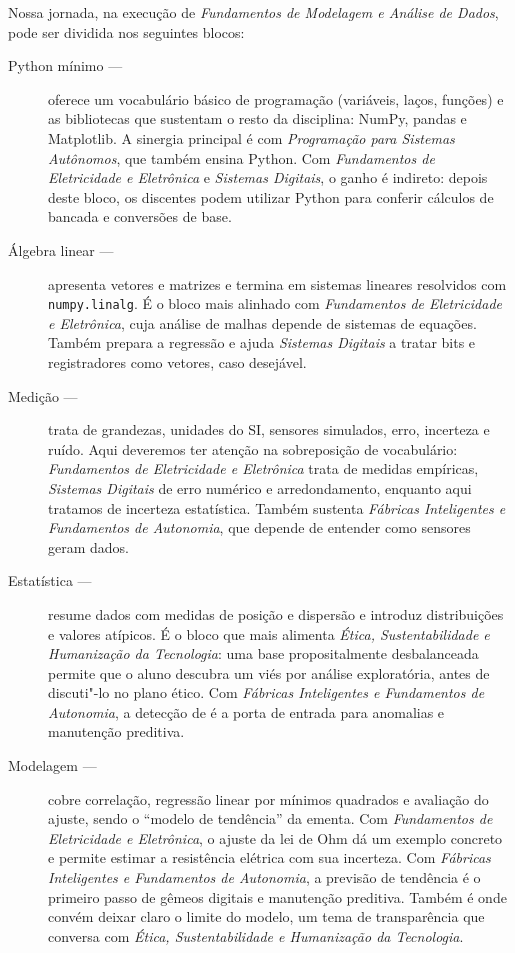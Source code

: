 Nossa jornada, na execução de \emph{Fundamentos de Modelagem e Análise de Dados}, pode ser dividida nos seguintes blocos:
\begin{description}
	\item[Python mínimo ---] oferece um vocabulário básico de programação (variáveis, laços, funções) e as bibliotecas que sustentam o resto da disciplina: NumPy, pandas e Matplotlib. A sinergia principal é com \emph{Programação para Sistemas Autônomos}, que também ensina Python. Com \emph{Fundamentos de Eletricidade e Eletrônica} e \emph{Sistemas Digitais}, o ganho é indireto: depois deste bloco, os discentes podem utilizar Python para conferir cálculos de bancada e conversões de base.
	\item[Álgebra linear ---] apresenta vetores e matrizes e termina em sistemas lineares resolvidos com \lstinline{numpy.linalg}. É o bloco mais alinhado com \emph{Fundamentos de Eletricidade e Eletrônica}, cuja análise de malhas depende de sistemas de equações. Também prepara a regressão e ajuda \emph{Sistemas Digitais} a tratar bits e registradores como vetores, caso desejável.
	\item[Medição ---] trata de grandezas, unidades do SI, sensores simulados, erro, incerteza e ruído. Aqui deveremos ter atenção na sobreposição de vocabulário: \emph{Fundamentos de Eletricidade e Eletrônica} trata de medidas empíricas, \emph{Sistemas Digitais} de erro numérico e arredondamento, enquanto aqui tratamos de incerteza estatística. Também sustenta \emph{Fábricas Inteligentes e Fundamentos de Autonomia}, que depende de entender como sensores geram dados.
	\item[Estatística ---] resume dados com medidas de posição e dispersão e introduz distribuições e valores atípicos. É o bloco que mais alimenta \emph{Ética, Sustentabilidade e Humanização da Tecnologia}: uma base propositalmente desbalanceada permite que o aluno descubra um viés por análise exploratória, antes de discuti"-lo no plano ético. Com \emph{Fábricas Inteligentes e Fundamentos de Autonomia}, a detecção de  é a porta de entrada para anomalias e manutenção preditiva.
	\item[Modelagem ---] cobre correlação, regressão linear por mínimos quadrados e avaliação do ajuste, sendo o \enquote{modelo de tendência} da ementa. Com \emph{Fundamentos de Eletricidade e Eletrônica}, o ajuste da lei de Ohm dá um exemplo concreto e permite estimar a resistência elétrica com sua incerteza. Com \emph{Fábricas Inteligentes e Fundamentos de Autonomia}, a previsão de tendência é o primeiro passo de gêmeos digitais e manutenção preditiva. Também é onde convém deixar claro o limite do modelo, um tema de transparência que conversa com \emph{Ética, Sustentabilidade e Humanização da Tecnologia}.

\end{description}
